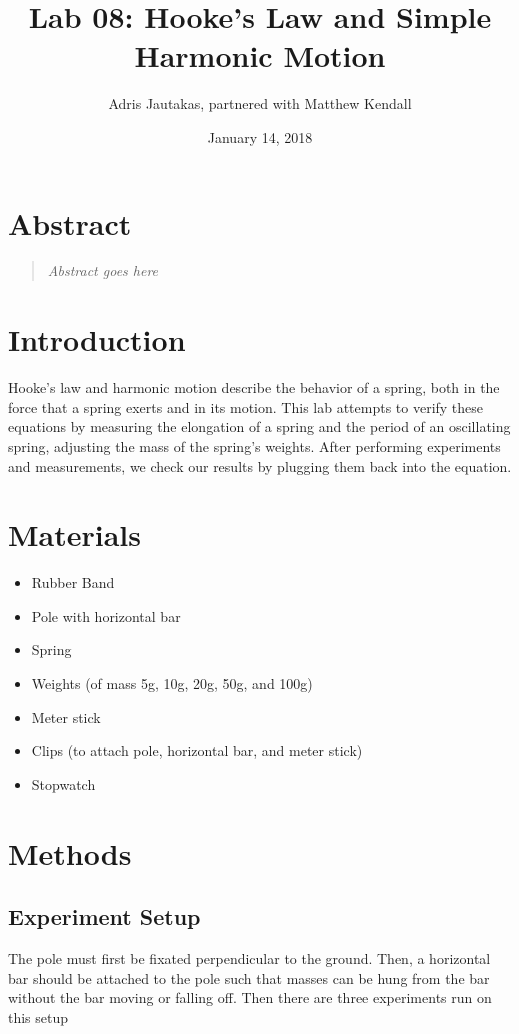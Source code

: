 \documentclass[12pt]{article}
\title{Lab 08: Hooke's Law and Simple Harmonic Motion}
\author{Adris Jautakas, partnered with Matthew Kendall}
\date{January 14, 2018}
\begin{document}
   \maketitle

    \section*{Abstract}
        \begin{quote}
        {\textit {\small 
            Abstract goes here
        } }
        \end{quote}

    \section{Introduction}
        Hooke's law and harmonic motion describe the behavior of a spring, both
        in the force that a spring exerts and in its motion. This lab attempts
        to verify these equations by measuring the elongation of a spring and
        the period of an oscillating spring, adjusting the mass of the spring's
        weights. After performing experiments and measurements, we check
        our results by plugging them back into the equation.
        
    \section{Materials}
        \begin{itemize}
            \item Rubber Band
            \item Pole with horizontal bar
            \item Spring
            \item Weights (of mass 5g, 10g, 20g, 50g, and 100g)
            \item Meter stick
            \item Clips (to attach pole, horizontal bar, and meter stick)
            \item Stopwatch
        \end{itemize}
    
    \section{Methods}
        \subsection{Experiment Setup}
            The pole must first be fixated perpendicular to the ground.
            Then, a horizontal bar should be attached to the pole such that
            masses can be hung from the bar without the bar moving or falling
            off. Then there are three experiments run on this setup
\end{document}
